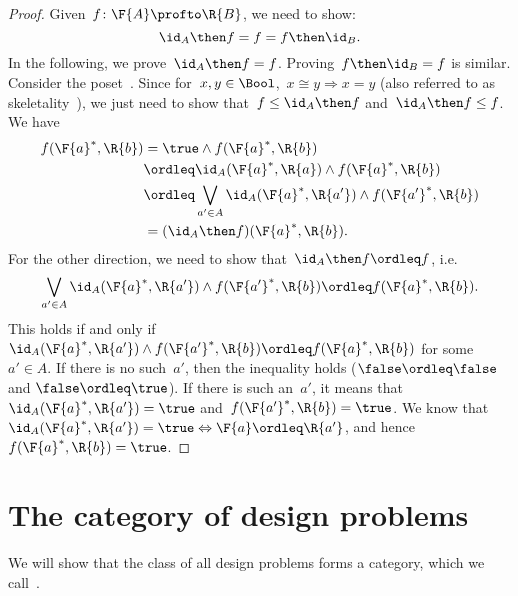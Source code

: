 \begin{proof}
  Given~$f\colon \F{A}\profto \R{B}$, we need to show:
  \begin{equation}
    \id_A \then f= f = f\then \id_B.
  \end{equation}
  In the following, we prove~$\id_A \then f = f$. Proving~$f\then \id_B=f$ is similar.
  Consider the poset~\Bool. Since for~$x,y\in \Bool$,~$x\cong y \Rightarrow x=y$ (also referred to as skeletality~\cite{fong2019}), we just need to show that~$f\leq \id_A\then f$ and~$\id_A\then f\leq f$.
  We have
  \begin{equation}
    \begin{aligned}
      f(\F{a}^*,\R{b})&=\true \wedge f(\F{a}^*,\R{b})\\
      &\ordleq \id_A(\F{a}^*,\R{a}) \wedge f(\F{a}^*,\R{b})\\
      &\ordleq \bigvee_{a'\in A}\id_A(\F{a}^*,\R{a'})\wedge f(\F{a'}^*,\R{b})\\
      &=(\id_A\then f)(\F{a}^*,\R{b}).
    \end{aligned}
  \end{equation}
  For the other direction, we need to show that~$\id_A\then f\ordleq f$, i.e.
  \begin{equation}
    \bigvee_{a'\in A}\id_A(\F{a}^*,\R{a'})\wedge f(\F{a'}^*,\R{b}) \ordleq f(\F{a}^*,\R{b}).
  \end{equation}
  This holds if and only if~$\id_A(\F{a}^*,\R{a'})\wedge f(\F{a'}^*,\R{b}) \ordleq f(\F{a}^*,\R{b})$ for some~$a'\in A$. If there is no such~$a'$, then the inequality holds ($\false \ordleq \false$ and $\false \ordleq \true$). If there is such an~$a'$, it means that~$\id_A(\F{a}^*,\R{a'})=\true$ and~$f(\F{a'}^*,\R{b})=\true$. We know that~$\id_A(\F{a}^*,\R{a'})=\true \Leftrightarrow \F{a}\ordleq \R{a'}$, and hence~$f(\F{a}^*,\R{b})=\true$.
\end{proof}

\section{The category of design problems}

We will show that the class of all design problems forms a category, which we call~\DP.

